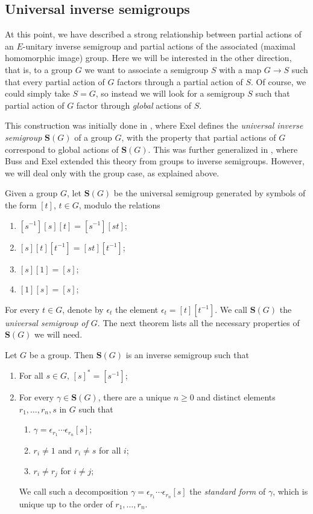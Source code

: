 \subsection{Universal inverse semigroups}

At this point, we have described a strong relationship between partial actions of an $E$-unitary inverse semigroup and partial actions of the associated (maximal homomorphic image) group. Here we will be interested in the other direction, that is, to a group $G$ we want to associate a semigroup $S$ with a map $G\to S$ such that every partial action of $G$ factors through a partial action of $S$. Of course, we could simply take $S=G$, so instead we will look for a semigroup $S$ such that partial action of $G$ factor through \emph{global} actions of $S$.

This construction was initially done in \cite{MR1469405}, where Exel defines the \emph{universal inverse semigroup} $\mathbf{S}(G)$ of a group $G$, with the property that partial actions of $G$ correspond to global actions of $\mathbf{S}(G)$. This was further generalized in \cite{MR3231479}, where Buss and Exel extended this theory from groups to inverse semigroups. However, we will deal only with the group case, as explained above.

Given a group $G$, let $\mathbf{S}(G)$ be the universal semigroup generated by symbols of the form $[t]$, $t\in G$, modulo the relations
\begin{enumerate}
\item[(i)] $[s^{-1}][s][t]=[s^{-1}][st]$;
\item[(ii)] $[s][t][t^{-1}]=[st][t^{-1}]$;
\item[(iii)] $[s][1]=[s]$;
\item[(iv)] $[1][s]=[s]$;
\end{enumerate}
For every $t\in G$, denote by $\epsilon_t$ the element $\epsilon_t=[t][t^{-1}]$. We call $\mathbf{S}(G)$ the \emph{universal semigroup of $G$}. The next theorem lists all the necessary properties of $\mathbf{S}(G)$ we will need.

\begin{theorem}
Let $G$ be a group. Then $\mathbf{S}(G)$ is an inverse semigroup such that
\begin{enumerate}
\item[(a)] For all $s\in G$, $[s]^*=[s^{-1}]$;
\item[(b)] For every $\gamma\in\mathbf{S}(G)$, there are a unique $n\geq 0$ and distinct elements $r_1,\ldots,r_n,s$ in $G$ such that
\begin{enumerate}
\item[(i)] $\gamma=\epsilon_{r_1}\cdots\epsilon_{r_n}[s]$;
\item[(ii)] $r_i\neq 1$ and $r_i\neq s$ for all $i$;
\item[(iii)] $r_i\neq r_j$ for $i\neq j$;
\end{enumerate}
We call such a decomposition $\gamma=\epsilon_{r_1}\cdots\epsilon_{r_n}[s]$ the \emph{standard form} of $\gamma$, which is unique up to the order of $r_1,\ldots,r_n$.
\end{enumerate}
\end{theorem}

